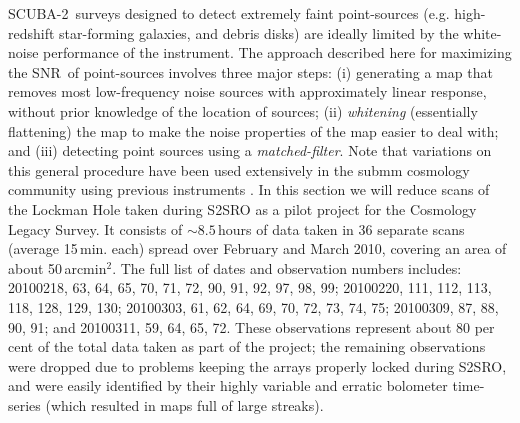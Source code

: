 \documentclass[useAMS,usenatbib,nofootinbib]{mn2e}
\newcommand{\snr}{SNR}
\newcommand{\scuba}{SCUBA-2}
\begin{document}
\scuba\ surveys designed to detect extremely faint point-sources
(e.g. high-redshift star-forming galaxies, and debris disks) are
ideally limited by the white-noise performance of the instrument. The
approach described here for maximizing the \snr\ of point-sources
involves three major steps: (i) generating a map that removes most
low-frequency noise sources with approximately linear response,
without prior knowledge of the location of sources; (ii)
\emph{whitening} (essentially flattening) the map to make the noise
properties of the map easier to deal with; and (iii) detecting point
sources using a \emph{matched-filter}. Note that variations on this
general procedure have been used extensively in the submm cosmology
community using previous instruments
\citep[e.g.][]{scott2002,borys2003,laurent2005,coppin2006,scott2008,perera2008,devlin2009}.
In this section we will reduce scans of the Lockman Hole taken during
S2SRO as a pilot project for the Cosmology Legacy Survey. It consists
of $\sim8.5$\,hours of data taken in 36 separate scans (average
15\,min. each) spread over February and March 2010, covering an area
of about 50\,arcmin$^2$. The full list of dates and observation
numbers includes: 20100218, 63, 64, 65, 70, 71, 72, 90, 91, 92, 97,
98, 99; 20100220, 111, 112, 113, 118, 128, 129, 130; 20100303, 61, 62,
64, 69, 70, 72, 73, 74, 75; 20100309, 87, 88, 90, 91; and 20100311,
59, 64, 65, 72. These observations represent about 80 per cent of the
total data taken as part of the project; the remaining observations
were dropped due to problems keeping the arrays properly locked during
S2SRO, and were easily identified by their highly variable and erratic
bolometer time-series (which resulted in maps full of large streaks).
\end{document}
